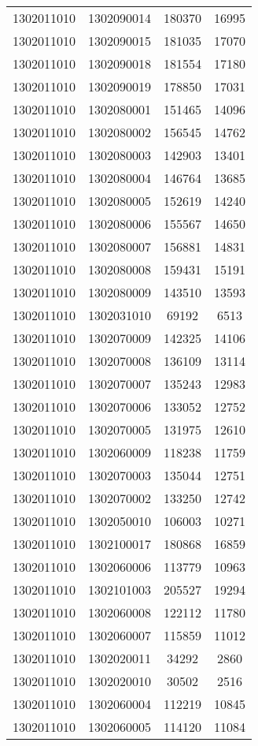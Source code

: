 \begin{longtable}{llcc}
1302011010 & 1302090014 & 180370 & 16995\\
1302011010 & 1302090015 & 181035 & 17070\\
1302011010 & 1302090018 & 181554 & 17180\\
1302011010 & 1302090019 & 178850 & 17031\\
1302011010 & 1302080001 & 151465 & 14096\\
1302011010 & 1302080002 & 156545 & 14762\\
1302011010 & 1302080003 & 142903 & 13401\\
1302011010 & 1302080004 & 146764 & 13685\\
1302011010 & 1302080005 & 152619 & 14240\\
1302011010 & 1302080006 & 155567 & 14650\\
1302011010 & 1302080007 & 156881 & 14831\\
1302011010 & 1302080008 & 159431 & 15191\\
1302011010 & 1302080009 & 143510 & 13593\\
1302011010 & 1302031010 & 69192 & 6513\\
1302011010 & 1302070009 & 142325 & 14106\\
1302011010 & 1302070008 & 136109 & 13114\\
1302011010 & 1302070007 & 135243 & 12983\\
1302011010 & 1302070006 & 133052 & 12752\\
1302011010 & 1302070005 & 131975 & 12610\\
1302011010 & 1302060009 & 118238 & 11759\\
1302011010 & 1302070003 & 135044 & 12751\\
1302011010 & 1302070002 & 133250 & 12742\\
1302011010 & 1302050010 & 106003 & 10271\\
1302011010 & 1302100017 & 180868 & 16859\\
1302011010 & 1302060006 & 113779 & 10963\\
1302011010 & 1302101003 & 205527 & 19294\\
1302011010 & 1302060008 & 122112 & 11780\\
1302011010 & 1302060007 & 115859 & 11012\\
1302011010 & 1302020011 & 34292 & 2860\\
1302011010 & 1302020010 & 30502 & 2516\\
1302011010 & 1302060004 & 112219 & 10845\\
1302011010 & 1302060005 & 114120 & 11084\\

\end{longtable}
